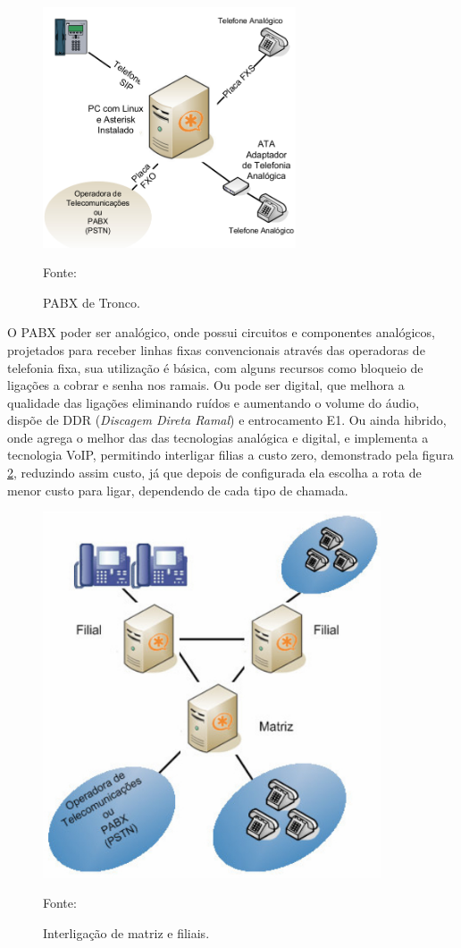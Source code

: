 \begin{figure}[h]
	\centering
	\includegraphics[width=7.5cm]{imagens/PABXAsterisk.jpg}
	\caption{PABX de Tronco.}
    \label{Figura14}
    Fonte: \cite{flavioeduardoandredade2005}
\end{figure}

O PABX poder ser analógico, onde possui circuitos e componentes analógicos, projetados para receber linhas fixas convencionais através das operadoras de telefonia fixa, sua utilização é básica, com alguns recursos como bloqueio de ligações a cobrar e senha nos ramais. Ou pode ser digital, que melhora a qualidade das ligações eliminando ruídos e aumentando o volume do áudio, dispõe de DDR (\textit{Discagem Direta Ramal}) e entrocamento E1. Ou ainda hibrido, onde agrega o melhor das das tecnologias analógica e digital, e implementa a tecnologia VoIP, permitindo interligar filias a custo zero, demonstrado pela figura \ref{Figura15}, reduzindo assim custo, já que depois de configurada ela escolha a rota de menor custo para ligar, dependendo de cada tipo de chamada.

\begin{figure}[h]
	\centering
	\includegraphics[width=10cm]{imagens/matrizFiliaisAsteirsk.jpg}
	\caption{Interligação de matriz e filiais.}
    \label{Figura15}
    Fonte: \cite{flavioeduardoandredade2005}
\end{figure}


